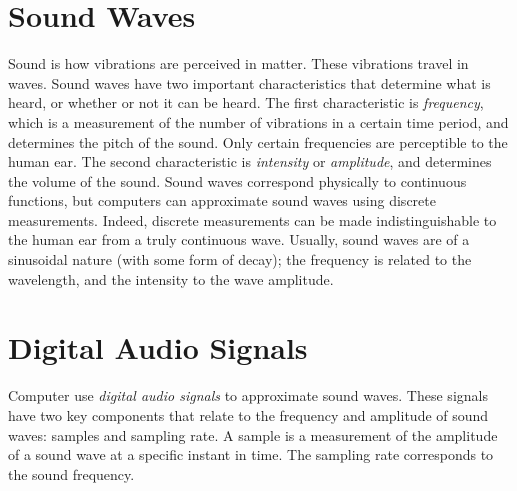 
\section*{Sound Waves} %

Sound is how vibrations are perceived in matter.
These vibrations travel in waves.
Sound waves have two important characteristics that determine what is heard, or whether or not it can be heard.
The first characteristic is \emph{frequency}, which is a measurement of the number of vibrations in a certain time period, and determines the pitch of the sound.
Only certain frequencies are perceptible to the human ear.
The second characteristic is \emph{intensity} or \emph{amplitude}, and determines the volume of the sound.
Sound waves correspond physically to continuous functions, but computers can approximate sound waves using discrete measurements.
Indeed, discrete measurements can be made indistinguishable to the human ear from a truly continuous wave.
Usually, sound waves are of a sinusoidal nature (with some form of decay); the frequency is related to the wavelength, and the intensity to the wave amplitude.

\section*{Digital Audio Signals} %

Computer use \emph{digital audio signals} to approximate sound waves.
These signals have two key components that relate to the frequency and amplitude of sound waves: samples and sampling rate.
A sample is a measurement of the amplitude of a sound wave at a specific instant in time.
The sampling rate corresponds to the sound frequency.

